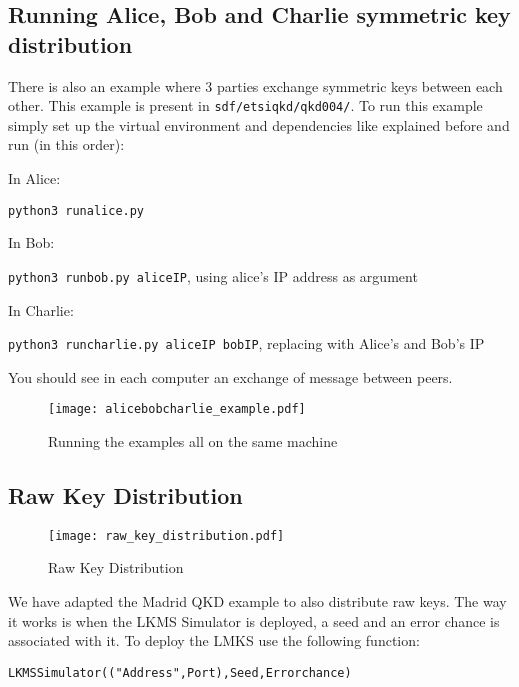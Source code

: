 \begin{refsection}

\subsection{Running Alice, Bob and Charlie symmetric key distribution}

There is also an example where 3 parties exchange symmetric keys between each other. This example is present in \texttt{sdf/etsi\textunderscore qkd/qkd004/}. To run this example simply set up the virtual environment and dependencies like explained before and run (in this order):

In Alice:

\texttt{python3 run\textunderscore alice.py}

In Bob:

\texttt{python3 run\textunderscore bob.py aliceIP}, using alice's IP address as argument

In Charlie:

\texttt{python3 run\textunderscore charlie.py aliceIP bobIP}, replacing with Alice's and Bob's IP

You should see in each computer an exchange of message between peers.

\begin{figure}[H]
	\centering
	\texttt{[image: alicebobcharlie\_example.pdf]}
	\caption{Running the examples all on the same machine}
	\label{fig:3partyexample}
\end{figure}

\subsection{Raw Key Distribution}

\begin{figure}[H]
	\centering
	\texttt{[image: raw\_key\_distribution.pdf]}
	\caption{Raw Key Distribution}
	\label{fig:rawkeydistribution}
\end{figure}

We have adapted the Madrid QKD example to also distribute raw keys. The way it works is when the LKMS Simulator is deployed, a seed and an error chance is associated with it. To deploy the LMKS use the following function:

\texttt{LKMSSimulator(("Address",Port),Seed,Error\textunderscore chance)}


\end{refsection}
